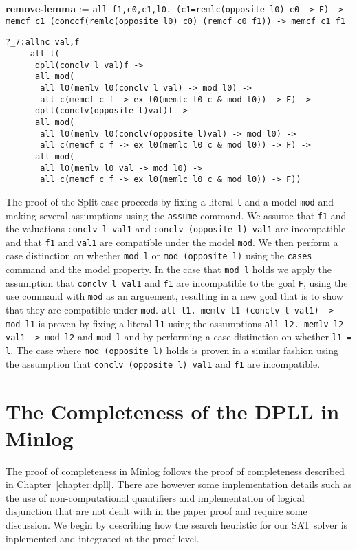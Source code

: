 \begin{center}
\textbf{remove-lemma} := \texttt{all f1,c0,c1,l0. (c1=remlc(opposite l0) c0 -> F) -> memcf c1 (conccf(remlc(opposite l0) c0) (remcf c0 f1)) -> memcf c1 f1}  
\end{center}

\begin{lstlisting}[caption = "The Split Case in Minlog"]
?_7:allnc val,f
     all l(
      dpll(conclv l val)f ->
      all mod(
       all l0(memlv l0(conclv l val) -> mod l0) ->
       all c(memcf c f -> ex l0(memlc l0 c & mod l0)) -> F) ->
      dpll(conclv(opposite l)val)f ->
      all mod(
       all l0(memlv l0(conclv(opposite l)val) -> mod l0) ->
       all c(memcf c f -> ex l0(memlc l0 c & mod l0)) -> F) ->
      all mod(
       all l0(memlv l0 val -> mod l0) ->
       all c(memcf c f -> ex l0(memlc l0 c & mod l0)) -> F))
\end{lstlisting}

The proof of the Split case proceeds by fixing a literal \texttt{l} and a model \texttt{mod} and making several assumptions using the \texttt{assume} command. We assume that \texttt{f1} and the valuations \texttt{conclv l val1} and \texttt{conclv (opposite l) val1} are incompatible and that \texttt{f1} and \texttt{val1} are compatible under the model \texttt{mod}. We then perform a case distinction on whether \texttt{mod l}  or \texttt{mod (opposite l)} using the \texttt{cases} command and the model property. In the case that \texttt{mod l} holds we apply the assumption that \texttt{conclv l val1} and \texttt{f1} are incompatible  to the goal \texttt{F}, using the use  command with \texttt{mod} as an arguement, resulting in a new goal that is to show that they are compatible under \texttt{mod}. \texttt{all l1. memlv l1 (conclv l val1) -> mod l1} is proven by fixing a literal \texttt{l1} using the assumptions \texttt{all l2. memlv l2 val1 -> mod l2} and \texttt{mod l} and by performing a case distinction on whether \texttt{l1 = l}. The case where \texttt{mod (opposite l)} holds is proven in a similar fashion using the assumption that \texttt{conclv (opposite l) val1} and \texttt{f1} are incompatible.




\section{The Completeness of the DPLL in Minlog}
The proof of completeness in Minlog follows the proof of completeness described in Chapter~\ref{chapter:dpll}. There are however some implementation details such as the use of non-computational quantifiers and implementation of logical disjunction that are not dealt with in the paper proof and require some discussion. We begin by describing how the search heuristic for our SAT solver is inplemented and integrated at the proof level.




